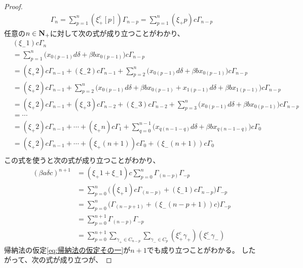 {\begin{proof}
\begin{equation*}
\begin{split}
			\Gamma_n = \sum_{p=1}^n (\xi_+^c[p])\Gamma_{n-p}
			= \sum_{p=1}^n (\xi_+p)c \Gamma_{n-p}
		\end{split}\end{equation*}
		任意の$n\in\mathbf{N}_+$に対して次の式が成り立つことがわかり、
		\begin{equation*}\begin{split}
			&(\xi_-1)c\Gamma_n \\
			&= \sum_{p=1}^n \bigl(x_{0(p-1)}d\delta + \beta bx_{0(p-1)}\bigr)c \Gamma_{n-p} \\
			&= (\xi_+2)c\Gamma_{n-1} + (\xi_-2)c\Gamma_{n-1}
				+ \sum_{p=2}^n \bigl(x_{0(p-1)}d\delta + \beta bx_{0(p-1)}\bigr)c \Gamma_{n-p} \\
			&= (\xi_+2)c\Gamma_{n-1}
				+ \sum_{p=2}^n \bigl(
					x_{0(p-1)}d\delta + \beta bx_{0(p-1)} + x_{1(p-1)}d\delta + \beta bx_{1(p-1)}
				\bigr)c \Gamma_{n-p} \\
			&= (\xi_+2)c\Gamma_{n-1} + (\xi_+3)c\Gamma_{n-2} + (\xi_-3)c\Gamma_{n-2}
				+ \sum_{p=3}^n \bigl(x_{0(p-1)}d\delta + \beta bx_{0(p-1)}\bigr)c \Gamma_{n-p} \\
			&= \cdots \\
			&= (\xi_+2)c\Gamma_{n-1} +\cdots+ (\xi_+n)c\Gamma_1 + \sum_{q=0}^{n-1}
				\bigl(x_{q(n-1-q)}d\delta + \beta bx_{q(n-1-q)}\bigr)c \Gamma_0 \\
			&= (\xi_+2)c\Gamma_{n-1} +\cdots+ (\xi_+(n+1))c\Gamma_0 
				+ (\xi_-(n+1))c\Gamma_0 \\
		\end{split}\end{equation*}
		この式を使うと次の式が成り立つことがわかり、
		\begin{equation*}\begin{split}
			(\beta a\delta c)^{n+1} 
			&= (\xi_+1+\xi_-1)c \sum_{p=0}^n \Gamma_{(n-p)}\Gamma_{-p} \\
			&=  \sum_{p=0}^n \biggl(
				(\xi_+1)c\Gamma_{(n-p)} + (\xi_-1)c\Gamma_{n-p}\biggr)\Gamma_{-p} \\
			&=  \sum_{p=0}^n \biggl(
				\Gamma_{(n-p+1)} + (\xi_-(n-p+1))c\biggr)\Gamma_{-p} \\
			&= \sum_{p=0}^{n+1} \Gamma_{(n-p)}\Gamma_{-p} \\
			&= \sum_{p=0}^{n+1} \sum_{\gamma_+\in C_{n-p}}
				\sum_{\gamma_-\in C_p} (\xi_+^c\gamma_+)(\xi_-^c\gamma_-)
		\end{split}\end{equation*}
		帰納法の仮定\eqref{eq:帰納法の仮定その一}が$n+1$でも成り立つことがわかる。
		したがって、次の式が成り立つが、

\end{proof}}
